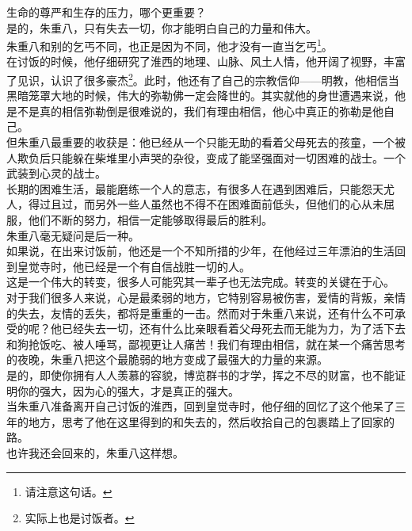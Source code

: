\begin{multicols}{\theparacolNo}
生命的尊严和生存的压力，哪个更重要？\\

是的，朱重八，只有失去一切，你才能明白自己的力量和伟大。\\

朱重八和别的乞丐不同，也正是因为不同，他才没有一直当乞丐\footnote{请注意这句话。}。\\

在讨饭的时候，他仔细研究了淮西的地理、山脉、风土人情，他开阔了视野，丰富了见识，认识了很多豪杰\footnote{实际上也是讨饭者。}。此时，他还有了自己的宗教信仰——明教，他相信当黑暗笼罩大地的时候，伟大的弥勒佛一定会降世的。其实就他的身世遭遇来说，他是不是真的相信弥勒倒是很难说的，我们有理由相信，他心中真正的弥勒是他自己。\\

但朱重八最重要的收获是：他已经从一个只能无助的看着父母死去的孩童，一个被人欺负后只能躲在柴堆里小声哭的杂役，变成了能坚强面对一切困难的战士。一个武装到心灵的战士。\\

长期的困难生活，最能磨练一个人的意志，有很多人在遇到困难后，只能怨天尤人，得过且过，而另外一些人虽然也不得不在困难面前低头，但他们的心从未屈服，他们不断的努力，相信一定能够取得最后的胜利。\\

朱重八毫无疑问是后一种。\\

如果说，在出来讨饭前，他还是一个不知所措的少年，在他经过三年漂泊的生活回到皇觉寺时，他已经是一个有自信战胜一切的人。\\

这是一个伟大的转变，很多人可能究其一辈子也无法完成。转变的关键在于心。\\

对于我们很多人来说，心是最柔弱的地方，它特别容易被伤害，爱情的背叛，亲情的失去，友情的丢失，都将是重重的一击。然而对于朱重八来说，还有什么不可承受的呢？他已经失去一切，还有什么比亲眼看着父母死去而无能为力，为了活下去和狗抢饭吃、被人唾骂，鄙视更让人痛苦！我们有理由相信，就在某一个痛苦思考的夜晚，朱重八把这个最脆弱的地方变成了最强大的力量的来源。\\

是的，即使你拥有人人羡慕的容貌，博览群书的才学，挥之不尽的财富，也不能证明你的强大，因为心的强大，才是真正的强大。\\

当朱重八准备离开自己讨饭的淮西，回到皇觉寺时，他仔细的回忆了这个他呆了三年的地方，思考了他在这里得到的和失去的，然后收拾自己的包裹踏上了回家的路。\\

也许我还会回来的，朱重八这样想。\\
\ifnum{}
	\end{multicols}
\fi
\newpage
